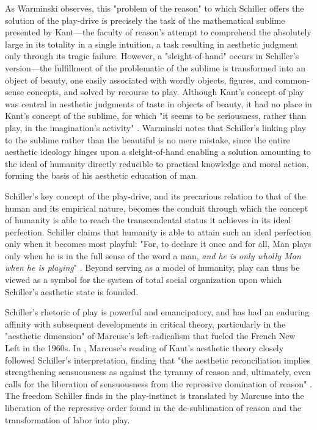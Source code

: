 As Warminski observes, this "problem of the reason" to which Schiller offers the solution of the play-drive is precisely the task of the mathematical sublime presented by Kant---the faculty of reason's attempt to comprehend the absolutely large in its totality in a single intuition, a task resulting in aesthetic judgment only through its tragic failure. However, a "sleight-of-hand" \autocite*[966]{Warminski2001-kd} occurs in Schiller's version---the fulfillment of the problematic of the sublime is transformed into an object of beauty, one easily associated with wordly objects, figures, and common-sense concepts, and solved by recourse to play. Although Kant's concept of play was central in aesthetic judgments of taste in objects of beauty, it had no place in Kant's concept of the sublime, for which "it seems to be seriousness, rather than play, in the imagination's activity" \autocite*[98]{Kant1987-coj}. Warminski notes that Schiller's linking play to the sublime rather than the beautiful is no mere mistake, since the entire aesthetic ideology hinges upon a sleight-of-hand enabling a solution amounting to the ideal of humanity directly reducible to practical knowledge and moral action, forming the basis of his aesthetic education of man.

Schiller's key concept of the play-drive, and its precarious relation to that of the human and its empirical nature, becomes the conduit through which the concept of humanity is able to reach the transcendental status it achieves in its ideal perfection. Schiller claims that humanity is able to attain such an ideal perfection only when it becomes most playful: "For, to declare it once and for all, Man plays only when he is in the full sense of the word a man, \emph{and he is only wholly Man when he is playing}" \autocite*[80]{Schiller2004-if}. Beyond serving as a model of humanity, play can thus be viewed as a symbol for the system of total social organization upon which Schiller's aesthetic state is founded.

Schiller's rhetoric of play is powerful and emancipatory, and has had an enduring affinity with subsequent developments in critical theory, particularly in the "aesthetic dimension" of Marcuse's left-radicalism that fueled the French New Left in the 1960s. In , Marcuse's reading of Kant's aesthetic theory closely followed Schiller's interpretation, finding that "the aesthetic reconciliation implies strengthening sensuousness as against the tyranny of reason and, ultimately, even calls for the liberation of sensuousness from the repressive domination of reason" \autocite[179]{Marcuse1974-oy}. The freedom Schiller finds in the play-instinct is translated by Marcuse into the liberation of the repressive order found in the de-sublimation of reason and the transformation of labor into play.

